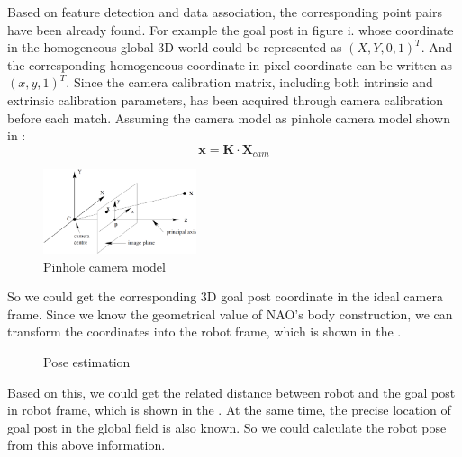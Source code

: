 Based on feature detection and data association, the corresponding point pairs have been already found. For example the goal post in figure i. whose coordinate in the homogeneous global 3D world could be represented as $(X,Y,0,1)^T$. And the corresponding homogeneous coordinate in pixel coordinate can be written as $(x,y,1)^T$. Since the camera calibration matrix, including both intrinsic and extrinsic calibration parameters, has been acquired through camera calibration before each match. Assuming the camera model as pinhole camera model shown in  \cite{hartley2003multiple}: 
\[ %
\mathbf{x} = \mathbf{K} \cdot \mathbf{X}_{cam}
\]
\begin{figure}[!htb]
    \includegraphics[width=0.4\textwidth]{pics/cameramodel.png}
    \centering
    \caption{Pinhole camera model}
    \label{fig: camera}
\end{figure}

So we could get the corresponding 3D goal post coordinate in the ideal camera frame. Since we know the geometrical value of NAO's body construction, we can transform the coordinates into the robot frame, which is shown in the .
\begin{figure}[tbp]
\centering
{}
\caption{Pose estimation}
\label{fig: trans}
\end{figure}
Based on this, we could get the related distance between robot and the goal post in robot frame, which is shown in the . At the same time, the precise location of goal post in the global field is also known. So we could calculate the robot pose from this above information.
